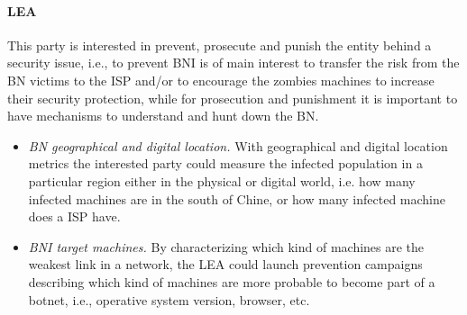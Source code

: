 \paragraph{LEA}
This party is interested in prevent, prosecute and punish the entity behind a security issue, i.e., to prevent BNI is of main interest to transfer the risk from the BN victims to the ISP and/or to encourage the zombies machines to increase their security protection, while for prosecution and punishment it is important to have mechanisms to understand and hunt down the BN.
\begin{itemize}
    \item \textit{BN geographical and digital location.} With geographical and digital location metrics the interested party could measure the infected population in a particular region either in the  physical or digital world, i.e. how many infected machines are in the south of Chine, or how many infected machine does a ISP have.
    \item \textit{BNI target machines.} By characterizing which kind of machines are the weakest link in a network, the LEA could launch prevention campaigns describing which kind of machines are more probable to become part of a botnet, i.e., operative system version, browser, etc.
\end{itemize}



